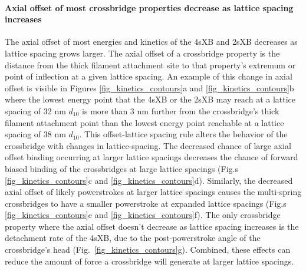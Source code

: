 \documentclass[]{article}
\begin{document}
\paragraph{Axial offset of most crossbridge properties decrease as lattice spacing increases} %
The axial offset of most energies and kinetics of the 4sXB and 2sXB decreases as lattice spacing grows larger.
The axial offset of a crossbridge property is the distance from the thick filament attachment site to that property's extremum or point of inflection at a given lattice spacing. 
An example of this change in axial offset is visible in Figures \ref{fig_kinetics_contours}a and \ref{fig_kinetics_contours}b where the lowest energy point that the 4sXB or the 2sXB may reach at a lattice spacing of 32 nm $d_{10}$ is more than 3 nm further from the crossbridge's thick filament attachment point than the lowest energy point reachable at a lattice spacing of 38 nm $d_{10}$.
This offset-lattice spacing rule alters the behavior of the crossbridge with changes in lattice-spacing.
The decreased chance of large axial offset binding occurring at larger lattice spacings decreases the chance of forward biased binding of the crossbridges at large lattice spacings (Fig.s \ref{fig_kinetics_contours}c and \ref{fig_kinetics_contours}d).
Similarly, the decreased axial offset of likely powerstrokes at larger lattice spacings causes the multi-spring crossbridges to have a smaller powerstroke at expanded lattice spacings (Fig.s \ref{fig_kinetics_contours}e and \ref{fig_kinetics_contours}f).
The only crossbridge property where the axial offset doesn't decrease as lattice spacing increases is the detachment rate of the 4sXB, due to the post-powerstroke angle of the crossbridge's head (Fig.\ \ref{fig_kinetics_contours}g).
Combined, these effects can reduce the amount of force a crossbridge will generate at larger lattice spacings.
\end{document}
